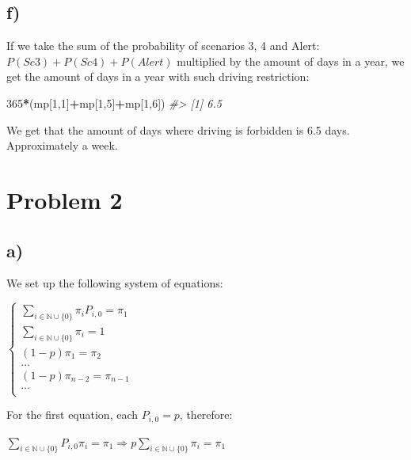 \documentclass[]{article}
\newenvironment{Shaded}{\begin{snugshade}}{\end{snugshade}}
\newcommand{\CommentTok}[1]{\textcolor[rgb]{0.56,0.35,0.01}{\textit{#1}}}
\newcommand{\DecValTok}[1]{\textcolor[rgb]{0.00,0.00,0.81}{#1}}
\newcommand{\NormalTok}[1]{#1}
\newcommand{\OperatorTok}[1]{\textcolor[rgb]{0.81,0.36,0.00}{\textbf{#1}}}
\begin{document}
\newpage

\hypertarget{f}{%
\subsection{f)}\label{f}}

If we take the sum of the probability of scenarios 3, 4 and Alert:
\(P(Sc3) + P(Sc4) + P(Alert)\) multiplied by the amount of days in a
year, we get the amount of days in a year with such driving restriction:

\begin{Shaded}
\begin{Highlighting}[]
\DecValTok{365}\OperatorTok{*}\NormalTok{(mp[}\DecValTok{1}\NormalTok{,}\DecValTok{1}\NormalTok{]}\OperatorTok{+}\NormalTok{mp[}\DecValTok{1}\NormalTok{,}\DecValTok{5}\NormalTok{]}\OperatorTok{+}\NormalTok{mp[}\DecValTok{1}\NormalTok{,}\DecValTok{6}\NormalTok{])}
\CommentTok{#> [1] 6.5}
\end{Highlighting}
\end{Shaded}

We get that the amount of days where driving is forbidden is 6.5 days.
Approximately a week.

\newpage

\hypertarget{problem-2}{%
\section{Problem 2}\label{problem-2}}

\hypertarget{a-1}{%
\subsection{a)}\label{a-1}}

We set up the following system of equations:

\(\begin{cases} \sum_{i \in \mathbb{N} \cup \{0\}} \pi_{i} P_{i,0} = \pi_{1} \\ \sum_{i \in \mathbb{N} \cup \{0\}} \pi_{i} = 1 \\ (1 - p) \pi_{1} = \pi_{2} \\ \dots \\ (1 - p) \pi_{n-2} = \pi_{n-1} \\ \dots \\ \end{cases}\)

For the first equation, each \(P_{i,0} = p\), therefore:

\(\sum_{i \in \mathbb{N} \cup \{0\}} P_{i,0} \pi_{i} = \pi_{1} \Rightarrow p \sum_{i \in \mathbb{N} \cup \{0\}} \pi_{i} = \pi_{1}\)
\end{document}
